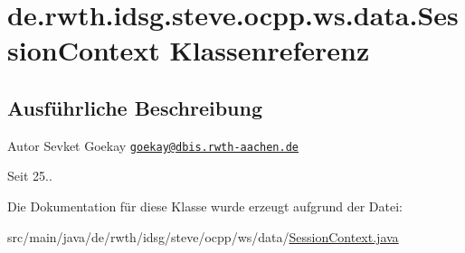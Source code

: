 \hypertarget{classde_1_1rwth_1_1idsg_1_1steve_1_1ocpp_1_1ws_1_1data_1_1_session_context}{\section{de.\-rwth.\-idsg.\-steve.\-ocpp.\-ws.\-data.\-Session\-Context Klassenreferenz}
\label{classde_1_1rwth_1_1idsg_1_1steve_1_1ocpp_1_1ws_1_1data_1_1_session_context}
}


\subsection{Ausführliche Beschreibung}
\begin{DoxyAuthor}{Autor}
Sevket Goekay \href{mailto:goekay@dbis.rwth-aachen.de}{\tt goekay@dbis.\-rwth-\/aachen.\-de} 
\end{DoxyAuthor}
\begin{DoxySince}{Seit}
25.. 
\end{DoxySince}


Die Dokumentation für diese Klasse wurde erzeugt aufgrund der Datei\-:\begin{DoxyCompactItemize}
\item 
src/main/java/de/rwth/idsg/steve/ocpp/ws/data/\hyperlink{_session_context_8java}{Session\-Context.\-java}\end{DoxyCompactItemize}
